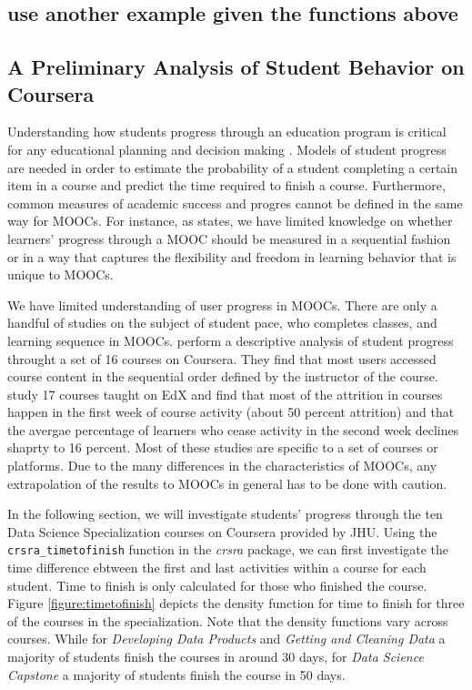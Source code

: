 \subsection{use another example given the functions
above}\label{use-another-example-given-the-functions-above}

\subsection{A Preliminary Analysis of Student Behavior on
Coursera}\label{a-preliminary-analysis-of-student-behavior-on-coursera}

Understanding how students progress through an education program is
critical for any educational planning and decision making
\citep{king1972primary}. Models of student progress are needed in order
to estimate the probability of a student completing a certain item in a
course and predict the time required to finish a course. Furthermore,
common measures of academic success and progres cannot be defined in the
same way for MOOCs. For instance, as \cite{perna2014moving} states, we
have limited knowledge on whether learners' progress through a MOOC
should be measured in a sequential fashion or in a way that captures the
flexibility and freedom in learning behavior that is unique to MOOCs.

We have limited understanding of user progress in MOOCs. There are only
a handful of studies on the subject of student pace, who completes
classes, and learning sequence in MOOCs. \cite{perna2014moving} perform
a descriptive analysis of student progress throught a set of 16 courses
on Coursera. They find that most users accessed course content in the
sequential order defined by the instructor of the course.
\cite{ho2014harvardx} study 17 courses taught on EdX and find that most
of the attrition in courses happen in the first week of course activity
(about 50 percent attrition) and that the avergae percentage of learners
who cease activity in the second week declines shaprty to 16 percent.
Most of these studies are specific to a set of courses or platforms. Due
to the many differences in the characteristics of MOOCs, any
extrapolation of the results to MOOCs in general has to be done with
caution.

In the following section, we will investigate students' progress through
the ten Data Science Specialization courses on Coursera provided by JHU.
Using the \texttt{crsra\_timetofinish} function in the \emph{crsra}
package, we can first investigate the time difference ebtween the first
and last activities within a course for each student. Time to finish is
only calculated for those who finished the course. Figure
\ref{figure:timetofinish} depicts the density function for time to
finish for three of the courses in the specialization. Note that the
density functions vary across courses. While for \emph{Developing Data
Products} and \emph{Getting and Cleaning Data} a majority of students
finish the courses in around 30 days, for \emph{Data Science Capstone} a
majority of students finish the course in 50 days.

